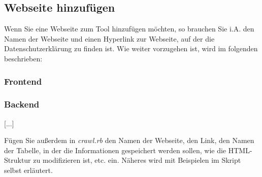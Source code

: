 \documentclass{article}
\begin{document}
	\subsection{Webseite hinzufügen}
	\label{sec:add-site}
	Wenn Sie eine Webseite zum Tool hinzufügen möchten, so brauchen Sie i.A. den Namen der Webseite und einen Hyperlink zur Webseite, auf der die Datenschutzerklärung zu finden ist. Wie weiter vorzugehen ist, wird im folgenden beschrieben:
	\subsubsection{Frontend}
	\subsubsection{Backend}
	[...]
	
	Fügen Sie außerdem in \textit{crawl.rb} den Namen der Webseite, den Link, den Namen der Tabelle, in der die Informationen gespeichert werden sollen, wie die HTML-Struktur zu modifizieren ist, etc. ein. Näheres wird mit Beispielen im Skript selbst erläutert.
	
	\newpage
\end{document}
